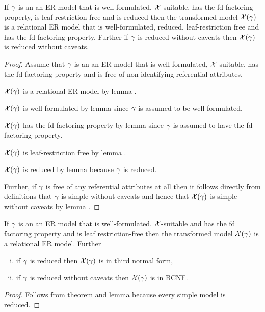 \begin{lemma}
If  $\gamma$ is an an ER model that is well-formulated,  $\mathcal{X}$-suitable, has the fd factoring property,
is leaf restriction free and is reduced
then the transformed model $\mathcal{X}(\gamma)$ is a  relational ER model that is well-formulated, reduced, leaf-restriction free
and has the fd factoring property.   
Further if $\gamma$ is  reduced without caveats then  $\mathcal{X}(\gamma)$ is reduced without caveats.
\end{lemma}
\begin{proof}
Assume that $\gamma$ is an an ER model that is well-formulated,  $\mathcal{X}$-suitable, has the fd factoring property and
is free of non-identifying referential attributes. 

$\mathcal{X}(\gamma)$ is a  relational ER model by lemma .

$\mathcal{X}(\gamma)$ is well-formulated by lemma  since $\gamma$ is assumed to be well-formulated.

$\mathcal{X}(\gamma)$ has the fd factoring property by lemma   since $\gamma$ is assumed to have the fd factoring property.

$\mathcal{X}(\gamma)$ is leaf-restriction free by lemma .

$\mathcal{X}(\gamma)$ is reduced by lemma   because $\gamma$ is reduced.

Further, if $\gamma$ is free of any referential attributes at all then it follows directly from definitions that $\gamma$ is simple without caveats
and hence  that $\mathcal{X}(\gamma)$ is simple without caveats by lemma .
\end{proof}

\begin{theorem}
If  $\gamma$ is an an ER model that is well-formulated,  $\mathcal{X}$-suitable and has the fd factoring property
and is leaf restriction-free
then the transformed model $\mathcal{X}(\gamma)$ is a  relational ER model. Further
\begin{enumerate}[(i)]
\item  if $\gamma$ is reduced  then  $\mathcal{X}(\gamma)$ is in third normal form, 
\item 
if $\gamma$ is reduced without caveats then  $\mathcal{X}(\gamma)$ is in BCNF.
\end{enumerate}
\end{theorem}
\begin{proof}
Follows from theorem  and lemma  because every simple model is reduced.
\end{proof}


